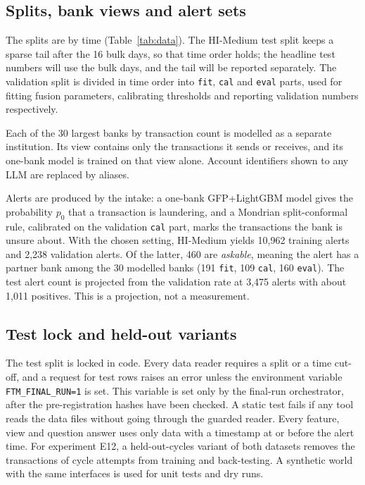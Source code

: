 \documentclass[11pt,a4paper]{article}
\begin{document}
\subsection{Splits, bank views and alert sets}

The splits are by time (Table~\ref{tab:data}). The HI-Medium test split keeps a sparse tail after the 16 bulk days, so that time order holds; the headline test numbers will use the bulk days, and the tail will be reported separately. The validation split is divided in time order into \texttt{fit}, \texttt{cal} and \texttt{eval} parts, used for fitting fusion parameters, calibrating thresholds and reporting validation numbers respectively.

Each of the 30 largest banks by transaction count is modelled as a separate institution. Its view contains only the transactions it sends or receives, and its one-bank model is trained on that view alone. Account identifiers shown to any LLM are replaced by aliases.

Alerts are produced by the intake: a one-bank GFP+LightGBM model gives the probability $p_0$ that a transaction is laundering, and a Mondrian split-conformal rule, calibrated on the validation \texttt{cal} part, marks the transactions the bank is unsure about. With the chosen setting, HI-Medium yields 10,962 training alerts and 2,238 validation alerts. Of the latter, 460 are \emph{askable}, meaning the alert has a partner bank among the 30 modelled banks (191 \texttt{fit}, 109 \texttt{cal}, 160 \texttt{eval}). The test alert count is projected from the validation rate at 3,475 alerts with about 1,011 positives. This is a projection, not a measurement.

\subsection{Test lock and held-out variants}

The test split is locked in code. Every data reader requires a split or a time cut-off, and a request for test rows raises an error unless the environment variable \texttt{FTM\_FINAL\_RUN=1} is set. This variable is set only by the final-run orchestrator, after the pre-registration hashes have been checked. A static test fails if any tool reads the data files without going through the guarded reader. Every feature, view and question answer uses only data with a timestamp at or before the alert time. For experiment E12, a held-out-cycles variant of both datasets removes the transactions of cycle attempts from training and back-testing. A synthetic world with the same interfaces is used for unit tests and dry runs.
\end{document}
